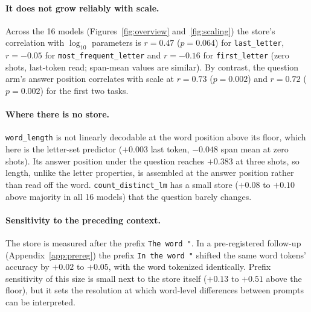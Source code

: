 \paragraph{It does not grow reliably with scale.}
Across the 16 models (Figures~\ref{fig:overview} and~\ref{fig:scaling}) the store's correlation with $\log_{10}$ parameters is $r = 0.47$
($p = 0.064$) for \texttt{last\_letter}, $r = -0.05$ for \texttt{most\_frequent\_letter} and
$r = -0.16$ for \texttt{first\_letter} (zero shots, last-token read; span-mean values are similar).
By contrast, the question arm's answer position correlates with scale at $r = 0.73$
($p = 0.002$) and $r = 0.72$ ($p = 0.002$) for the first two tasks.

\paragraph{Where there is no store.}
\texttt{word\_length} is not linearly decodable at the word position above its floor, which here
is the letter-set predictor ($+0.003$ last token, $-0.048$ span mean at zero shots). Its answer
position under the question reaches $+0.383$ at three shots, so length, unlike the letter
properties, is assembled at the answer position rather than read off the word.
\texttt{count\_distinct\_lm} has a small store ($+0.08$ to $+0.10$ above majority in all 16 models)
that the question barely changes.

\paragraph{Sensitivity to the preceding context.}
The store is measured after the prefix \texttt{The word "}. In a pre-registered follow-up
(Appendix~\ref{app:prereg}) the prefix \texttt{In the word "} shifted the same word tokens' accuracy
by $+0.02$ to $+0.05$, with the word tokenized identically. Prefix sensitivity of this size is small
next to the store itself ($+0.13$ to $+0.51$ above the floor), but it sets the resolution at which
word-level differences between prompts can be interpreted.
